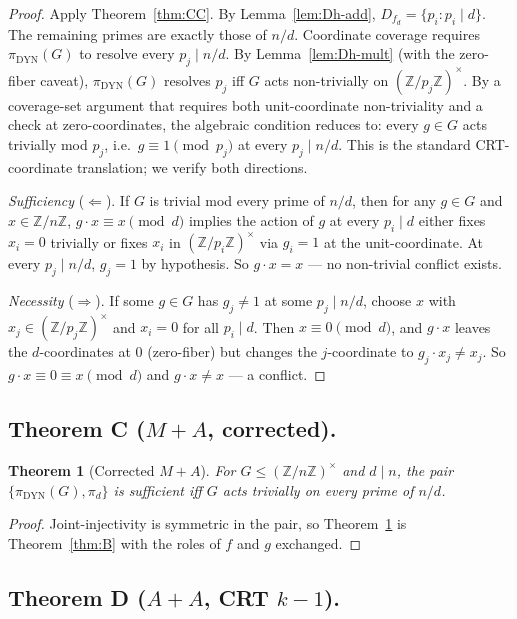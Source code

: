 \documentclass[11pt,reqno]{amsart}
\theoremstyle{plain}
\newtheorem{theorem}{Theorem}
\theoremstyle{definition}
\newcommand{\Z}{\mathbb{Z}}
\newcommand{\Zn}{\Z/n\Z}
\newcommand{\Zns}{(\Z/n\Z)^{\times}}
\newcommand{\DYN}{\mathrm{DYN}}
\begin{document}
\begin{proof}
Apply Theorem~\ref{thm:CC}. By Lemma~\ref{lem:Dh-add},
$D_{f_d} = \{p_i : p_i \mid d\}$. The remaining primes are exactly
those of $n/d$. Coordinate coverage requires $\pi_{\DYN}(G)$ to
resolve every $p_j \mid n/d$. By Lemma~\ref{lem:Dh-mult} (with the
zero-fiber caveat), $\pi_{\DYN}(G)$ resolves $p_j$ iff $G$ acts
non-trivially on $(\Z/p_j\Z)^{\times}$. By a coverage-set argument
that requires both unit-coordinate non-triviality and a check at
zero-coordinates, the algebraic condition reduces to: every $g \in G$
acts trivially mod $p_j$, i.e.\ $g \equiv 1 \pmod{p_j}$ at every
$p_j \mid n/d$. This is the standard CRT-coordinate translation; we
verify both directions.

\emph{Sufficiency} ($\Leftarrow$). If $G$ is trivial mod every prime
of $n/d$, then for any $g \in G$ and $x \in \Zn$, $g \cdot x \equiv x
\pmod d$ implies the action of $g$ at every $p_i \mid d$ either fixes
$x_i = 0$ trivially or fixes $x_i$ in $(\Z/p_i\Z)^{\times}$ via
$g_i = 1$ at the unit-coordinate. At every $p_j \mid n/d$, $g_j = 1$
by hypothesis. So $g \cdot x = x$ — no non-trivial conflict exists.

\emph{Necessity} ($\Rightarrow$). If some $g \in G$ has $g_j \neq 1$
at some $p_j \mid n/d$, choose $x$ with $x_j \in (\Z/p_j\Z)^{\times}$
and $x_i = 0$ for all $p_i \mid d$. Then $x \equiv 0 \pmod d$, and
$g \cdot x$ leaves the $d$-coordinates at $0$ (zero-fiber) but
changes the $j$-coordinate to $g_j \cdot x_j \neq x_j$. So
$g \cdot x \equiv 0 \equiv x \pmod d$ and $g \cdot x \neq x$ —
a conflict.
\end{proof}

\subsection{Theorem C ($M{+}A$, corrected).} \label{ssec:C}

\begin{theorem}[Corrected $M{+}A$] \label{thm:C}
For $G \leq \Zns$ and $d \mid n$, the pair $\{\pi_{\DYN}(G), \pi_d\}$
is sufficient iff $G$ acts trivially on every prime of $n/d$.
\end{theorem}

\begin{proof}
Joint-injectivity is symmetric in the pair, so Theorem~\ref{thm:C}
is Theorem~\ref{thm:B} with the roles of $f$ and $g$ exchanged.
\end{proof}

\subsection{Theorem D ($A{+}A$, CRT $k-1$).} \label{ssec:D}
\end{document}
